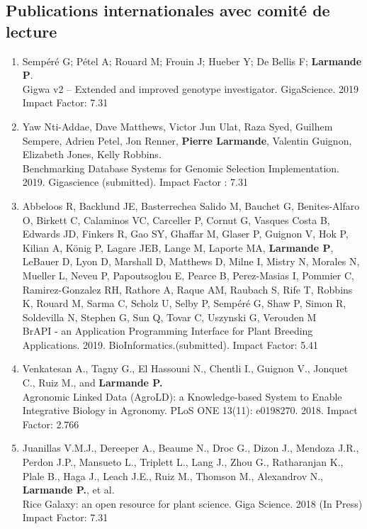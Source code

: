 \subsection*{Publications internationales avec comité de lecture} 

\begin{enumerate}
\item Sempéré G; Pétel A; Rouard M; Frouin J; Hueber Y; De Bellis F; \textbf{Larmande P}.\\ Gigwa v2 – Extended and improved genotype investigator. GigaScience. 2019 Impact Factor: 7.31
\item Yaw Nti-Addae, Dave Matthews, Victor Jun Ulat, Raza Syed, Guilhem Sempere, Adrien Petel, Jon Renner, \textbf{Pierre Larmande}, Valentin Guignon, Elizabeth Jones, Kelly Robbins.\\ Benchmarking Database Systems for Genomic Selection Implementation. 2019. Gigascience (submitted). Impact Factor : 7.31
\item Abbeloos R, Backlund JE, Basterrechea Salido M, Bauchet G, Benites-Alfaro O, Birkett C, Calaminos VC, Carceller P, Cornut G, Vasques Costa B, Edwards JD, Finkers R, Gao SY, Ghaffar M, Glaser P, Guignon V, Hok P, Kilian A, König P, Lagare JEB, Lange M, Laporte MA, \textbf{Larmande P}, LeBauer D, Lyon D, Marshall D, Matthews D, Milne I, Mistry N, Morales N, Mueller L, Neveu P, Papoutsoglou E, Pearce B, Perez-Masias I, Pommier C, Ramirez-Gonzalez RH, Rathore A, Raque AM, Raubach S, Rife T, Robbins K, Rouard M, Sarma C, Scholz U, Selby P, Sempéré G, Shaw P, Simon R, Soldevilla N, Stephen G, Sun Q, Tovar C, Uszynski G, Verouden M\\ BrAPI - an Application Programming Interface for Plant Breeding Applications. 2019. BioInformatics.(submitted). Impact Factor: 5.41
\item  Venkatesan A., Tagny G., El Hassouni N., Chentli I., Guignon V., Jonquet C., Ruiz M., and \textbf{Larmande P.}\\ Agronomic Linked Data (AgroLD): a Knowledge-based System to Enable Integrative Biology in Agronomy. PLoS ONE 13(11): e0198270. 2018. Impact Factor: 2.766
\item Juanillas V.M.J., Dereeper A., Beaume N., Droc G., Dizon J., Mendoza J.R., Perdon J.P., Mansueto L., Triplett L., Lang J., Zhou G., Ratharanjan K., Plale B., Haga J., Leach J.E., Ruiz M., Thomson M., Alexandrov N., \textbf{Larmande P.}, et al.\\ Rice Galaxy: an open resource for plant science. Giga Science. 2018 (In Press) Impact Factor: 7.31

\end{enumerate}
